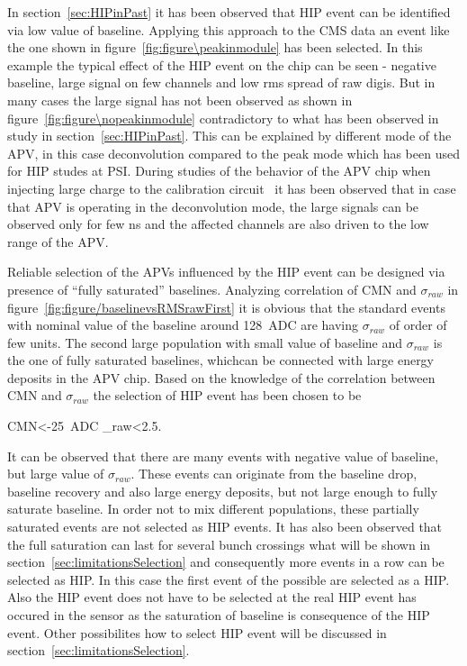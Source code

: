 In section~\ref{sec:HIPinPast} it has been observed that HIP event can be identified via low value of baseline. Applying this approach to the CMS data an event like the one shown in figure~\ref{fig:figure\peakinmodule} has been selected. In this example the typical effect of the HIP event on the chip can be seen - negative baseline, large signal on few channels and low rms spread of raw digis. But in many cases the large signal has not been observed as shown in figure~\ref{fig:figure\nopeakinmodule} contradictory to what has been observed in study in section~\ref{sec:HIPinPast}. This can be explained by different mode of the APV, in this case deconvolution compared to the peak mode which has been used for HIP studes at PSI. During studies of the behavior of the APV chip when injecting large charge to the calibration circuit~\cite{Bainbridge:2002bda} it has been observed that in case that APV is operating in the deconvolution mode, the large signals can be observed only for few ns and the affected channels are also driven to the low range of the APV. 


Reliable selection of the APVs influenced by the HIP event can be designed via presence of ``fully saturated'' baselines. Analyzing correlation of CMN and $\sigma_{raw}$ in figure~\ref{fig:figure/baselinevsRMSrawFirst} it is obvious that the standard events with nominal value of the baseline around 128~ADC are having $\sigma_{raw}$ of order of few units. The second large population with small value of baseline and $\sigma_{raw}$ is the one of fully saturated baselines, whichcan be connected with large energy deposits in the APV chip. Based on the knowledge of the correlation between CMN and $\sigma_{raw}$ the selection of HIP event has been chosen to be 

{
CMN<-25~ADC  \sigma_{raw}<2.5.
}


It can be observed that there are many events with negative value of baseline, but large value of $\sigma_{raw}$. These events can originate from the baseline drop, baseline recovery and also large energy deposits, but not large enough to fully saturate baseline. In order not to mix different populations, these partially saturated events are not selected as HIP events. It has also been observed that the full saturation can last for several bunch crossings what will be shown in section~\ref{sec:limitationsSelection} and consequently more events in a row can be selected as HIP. In this case the first event of the possible are selected as a HIP. Also the HIP event does not have to be selected at the real HIP event has occured in the sensor as the saturation of baseline is consequence of the HIP event. Other possibilites how to select HIP event will be discussed in section~\ref{sec:limitationsSelection}.

